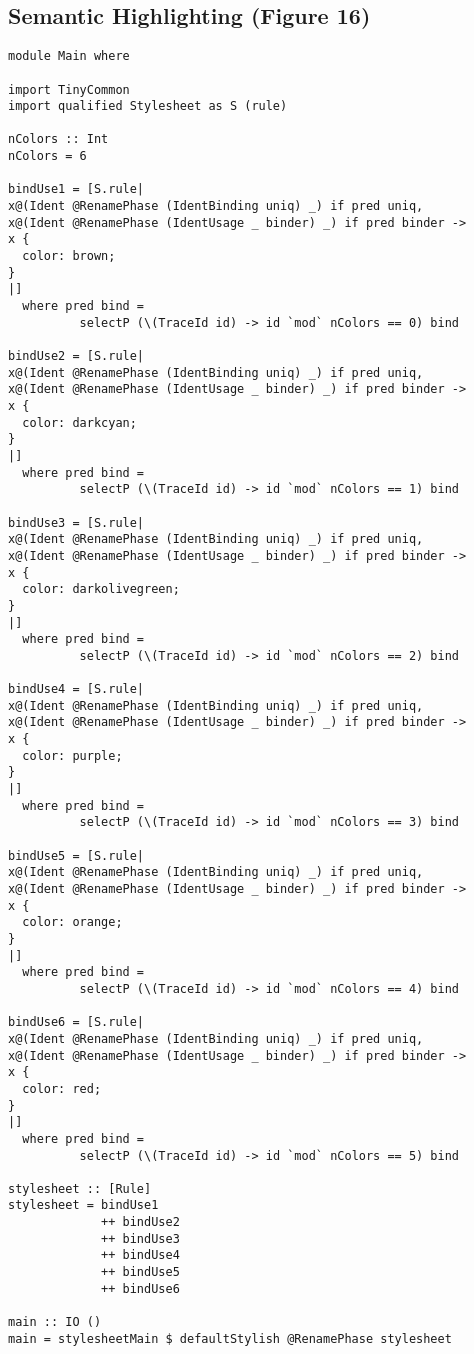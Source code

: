 \documentclass[acmsmall, screen]{acmart}
\begin{document}
\subsection{Semantic Highlighting (Figure 16)}
\label{sec:listing-semantic-highlighting}
{\scriptsize
\begin{verbatim}
module Main where

import TinyCommon
import qualified Stylesheet as S (rule)

nColors :: Int
nColors = 6

bindUse1 = [S.rule|
x@(Ident @RenamePhase (IdentBinding uniq) _) if pred uniq,
x@(Ident @RenamePhase (IdentUsage _ binder) _) if pred binder ->
x {
  color: brown;
}
|]
  where pred bind =
          selectP (\(TraceId id) -> id `mod` nColors == 0) bind

bindUse2 = [S.rule|
x@(Ident @RenamePhase (IdentBinding uniq) _) if pred uniq,
x@(Ident @RenamePhase (IdentUsage _ binder) _) if pred binder ->
x {
  color: darkcyan;
}
|]
  where pred bind =
          selectP (\(TraceId id) -> id `mod` nColors == 1) bind

bindUse3 = [S.rule|
x@(Ident @RenamePhase (IdentBinding uniq) _) if pred uniq,
x@(Ident @RenamePhase (IdentUsage _ binder) _) if pred binder ->
x {
  color: darkolivegreen;
}
|]
  where pred bind =
          selectP (\(TraceId id) -> id `mod` nColors == 2) bind

bindUse4 = [S.rule|
x@(Ident @RenamePhase (IdentBinding uniq) _) if pred uniq,
x@(Ident @RenamePhase (IdentUsage _ binder) _) if pred binder ->
x {
  color: purple;
}
|]
  where pred bind =
          selectP (\(TraceId id) -> id `mod` nColors == 3) bind

bindUse5 = [S.rule|
x@(Ident @RenamePhase (IdentBinding uniq) _) if pred uniq,
x@(Ident @RenamePhase (IdentUsage _ binder) _) if pred binder ->
x {
  color: orange;
}
|]
  where pred bind =
          selectP (\(TraceId id) -> id `mod` nColors == 4) bind

bindUse6 = [S.rule|
x@(Ident @RenamePhase (IdentBinding uniq) _) if pred uniq,
x@(Ident @RenamePhase (IdentUsage _ binder) _) if pred binder ->
x {
  color: red;
}
|]
  where pred bind =
          selectP (\(TraceId id) -> id `mod` nColors == 5) bind

stylesheet :: [Rule]
stylesheet = bindUse1
             ++ bindUse2
             ++ bindUse3
             ++ bindUse4
             ++ bindUse5
             ++ bindUse6

main :: IO ()
main = stylesheetMain $ defaultStylish @RenamePhase stylesheet

\end{verbatim}}
\clearpage
\end{document}

